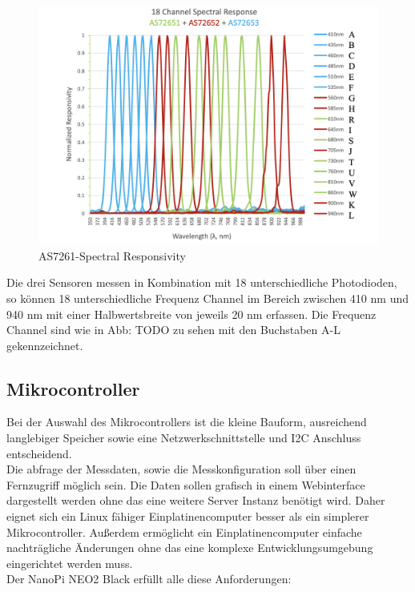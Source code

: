 \begin{figure}[H]
  \centering
 \includegraphics[width=0.9\linewidth]{img/AS7265X-Spectral_Responsivity.png}
  \caption{AS7261-Spectral Responsivity}
  \label{fig:AS7261-Spectral_Responsivity}
\end{figure}
Die drei Sensoren messen in Kombination mit 18 unterschiedliche Photodioden, so können 18 unterschiedliche Frequenz Channel im Bereich zwischen 410 nm und 940 nm mit einer Halbwertsbreite von jeweils 20 nm erfassen.
Die Frequenz Channel sind wie in Abb: TODO zu sehen mit den Buchstaben A-L gekennzeichnet.


\subsection{Mikrocontroller}\label{Mikrocontroller}
Bei der Auswahl des Mikrocontrollers ist die kleine Bauform, ausreichend langlebiger Speicher sowie eine Netzwerkschnittstelle und I2C Anschluss entscheidend.\\
Die abfrage der Messdaten, sowie die Messkonfiguration soll über einen Fernzugriff möglich sein. Die Daten sollen grafisch in einem Webinterface dargestellt werden ohne das eine weitere Server Instanz benötigt wird. Daher eignet sich ein Linux fähiger Einplatinencomputer besser als ein simplerer Mikrocontroller.
Außerdem ermöglicht ein Einplatinencomputer einfache nachträgliche Änderungen ohne das eine komplexe Entwicklungsumgebung eingerichtet werden muss.\\

Der NanoPi NEO2 Black erfüllt alle diese Anforderungen:




